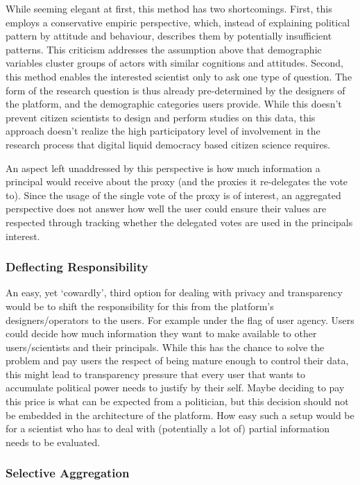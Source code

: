 While seeming elegant at first, this method has two shortcomings. First, this employs a conservative empiric perspective, which, instead of explaining political pattern by attitude and behaviour, describes them by potentially insufficient patterns. This criticism addresses the assumption above that demographic variables cluster groups of actors with similar cognitions and attitudes. Second, this method enables the interested scientist only to ask one type of question. The form of the research question is thus already pre-determined by the designers of the platform, and the demographic categories users provide. While this doesn't prevent citizen scientists to design and perform studies on this data, this approach doesn't realize the high participatory level of involvement in the research process that digital liquid democracy based citizen science requires.

An aspect left unaddressed by this perspective is how much information a principal would receive about the proxy (and the proxies it re-delegates the vote to). Since the usage of the single vote of the proxy is of interest, an aggregated perspective does not answer how well the user could ensure their values are respected through tracking whether the delegated votes are used in the principals interest. 

\subsubsection{Deflecting Responsibility}

An easy, yet ‘cowardly’, third option for dealing with privacy and transparency would be to shift the responsibility for this from the platform's designers/operators to the users. For example under the flag of user agency. Users could decide how much information they want to make available to other users/scientists and their principals. While this has the chance to solve the problem and pay users the respect of being mature enough to control their data, this might lead to transparency pressure that every user that wants to accumulate political power needs to justify by their self. Maybe deciding to pay this price is what can be expected from a politician, but this decision should not be embedded in the architecture of the platform. How easy such a setup would be for a scientist who has to deal with (potentially a lot of) partial information needs to be evaluated.

\subsubsection{Selective Aggregation}

